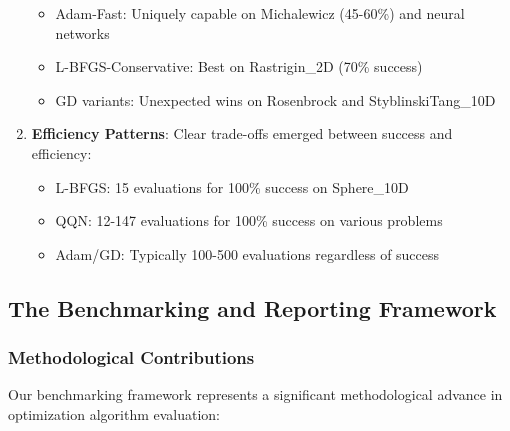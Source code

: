 \begin{enumerate}
  \begin{itemize}
  \tightlist
  \item
    Adam-Fast: Uniquely capable on Michalewicz (45-60\%) and neural networks
  \item
    L-BFGS-Conservative: Best on Rastrigin\_2D (70\% success)
  \item
    GD variants: Unexpected wins on Rosenbrock and StyblinskiTang\_10D
  \end{itemize}
\item
  \textbf{Efficiency Patterns}: Clear trade-offs emerged between success and efficiency:

  \begin{itemize}
  \tightlist
  \item
    L-BFGS: 15 evaluations for 100\% success on Sphere\_10D
  \item
    QQN: 12-147 evaluations for 100\% success on various problems
  \item
    Adam/GD: Typically 100-500 evaluations regardless of success
  \end{itemize}
\end{enumerate}

\hypertarget{the-benchmarking-and-reporting-framework}{%
\subsection{The Benchmarking and Reporting Framework}\label{the-benchmarking-and-reporting-framework}}

\hypertarget{methodological-contributions}{%
\subsubsection{Methodological Contributions}\label{methodological-contributions}}

Our benchmarking framework represents a significant methodological advance in optimization algorithm evaluation:

